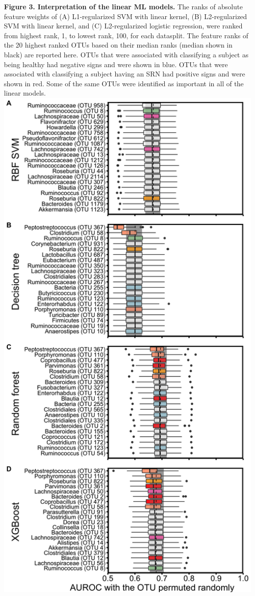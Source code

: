 \documentclass[11pt,]{article}
\begin{document}
\textbf{Figure 3. Interpretation of the linear ML models.} The ranks of
absolute feature weights of (A) L1-regularized SVM with linear kernel,
(B) L2-regularized SVM with linear kernel, and (C) L2-regularized
logistic regression, were ranked from highest rank, 1, to lowest rank,
100, for each datasplit. The feature ranks of the 20 highest ranked OTUs
based on their median ranks (median shown in black) are reported here.
OTUs that were associated with classifying a subject as being healthy
had negative signs and were shown in blue. OTUs that were associated
with classifying a subject having an SRN had positive signs and were
shown in red. Some of the same OTUs were identified as important in all
of the linear models. \newpage
\includegraphics{Figure_4.png}
\end{document}
